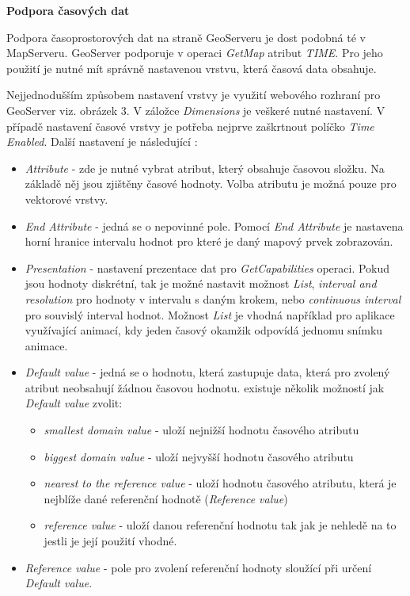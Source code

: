 \textbf{Podpora časových dat}

Podpora časoprostorových dat na straně GeoServeru je dost podobná té v MapServeru. GeoServer podporuje v operaci \textit{GetMap} atribut \textit{TIME}. Pro jeho použití je nutné mít správně nastavenou vrstvu, která časová data obsahuje.

Nejjednodušším způsobem nastavení vrstvy je využití webového rozhraní pro GeoServer viz. obrázek 3. V záložce \textit{Dimensions} je veškeré nutné nastavení. V případě nastavení časové vrstvy je potřeba nejprve zaškrtnout políčko \textit{Time Enabled}. Další nastavení je následující \cite{geoserver-layer-edit}:

\begin{itemize}
	\item \textit{Attribute} - zde je nutné vybrat atribut, který obsahuje časovou složku. Na základě něj jsou zjištěny časové hodnoty. Volba atributu je možná pouze pro vektorové vrstvy.  
	\item \textit{End Attribute} - jedná se o nepovinné pole. Pomocí \textit{End Attribute} je nastavena horní hranice intervalu hodnot pro které je daný mapový prvek zobrazován. 
	\item \textit{Presentation} - nastavení prezentace dat pro \textit{GetCapabilities} operaci. Pokud jsou hodnoty diskrétní, tak je možné nastavit možnost \textit{List}, \textit{interval and resolution} pro hodnoty v intervalu s daným krokem, nebo \textit{continuous interval} pro souvislý interval hodnot. Možnost \textit{List} je vhodná například pro aplikace využívající animací, kdy jeden časový okamžik odpovídá jednomu snímku animace.
	\item \textit{Default value} - jedná se o hodnotu, která zastupuje data, která pro zvolený atribut neobsahují žádnou časovou hodnotu. existuje několik možností jak \textit{Default value} zvolit:    
	\begin{itemize}
		\item \textit{smallest domain value} - uloží nejnižší hodnotu časového atributu
		\item \textit{biggest domain value} - uloží nejvyšší hodnotu časového atributu
		\item \textit{nearest to the reference value} - uloží hodnotu časového atributu, která je nejblíže dané referenční hodnotě (\textit{Reference value}) 
		\item \textit{reference value} - uloží danou referenční hodnotu tak jak je nehledě na to jestli je její použití vhodné.   
	\end{itemize}
	\item \textit{Reference value} - pole pro zvolení referenční hodnoty sloužící při určení \textit{Default value}.
\end{itemize}

